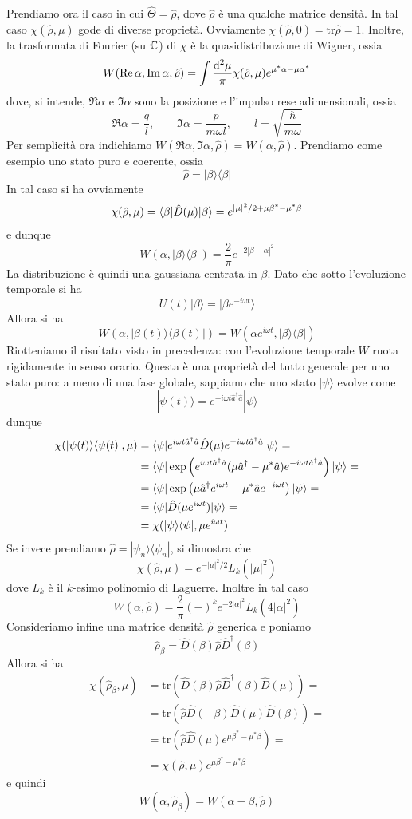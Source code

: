 \documentclass[a4paper, 11pt]{article}
\newcommand{\tr}{\mathrm{tr}}
\renewcommand{\ket}[1]{| #1\rangle}
\renewcommand{\bra}[1]{\langle #1|}
\begin{document}
Prendiamo ora il caso in cui $\hat{\Theta}=\hat{\rho}$, dove $\hat{\rho}$ è una qualche matrice densità. In tal caso $\chi(\hat{\rho},\mu)$ gode di diverse proprietà. Ovviamente $\chi(\hat{\rho},0)=\tr\hat{\rho}=1$. Inoltre, la trasformata di Fourier (su $\mathbb{C}$) di $\chi$ è la quasidistribuzione di Wigner, ossia
\[W(\mathrm{Re}\,\alpha,\mathrm{Im}\,\alpha,\hat{\rho})=\int\frac{\mathrm{d} ^2\mu}{\pi}\chi(\hat{\rho},\mu)e^{\mu^*\alpha-\mu\alpha^*}\]
dove, si intende, $\Re\alpha$ e $\Im\alpha$ sono la posizione e l'impulso rese adimensionali, ossia
\[\Re\alpha=\frac{q}{l},\qquad\Im\alpha=\frac{p}{m\omega l},\qquad l=\sqrt{\frac{\hbar}{m\omega}}\]
Per semplicità ora indichiamo $W(\Re\alpha,\Im\alpha,\hat{\rho})=W(\alpha,\hat{\rho})$. Prendiamo come esempio uno stato puro e coerente, ossia
\[\hat{\rho}=\ket\beta\bra \beta\]
In tal caso si ha ovviamente
\[\chi(\hat{\rho},\mu)=\langle\beta|\hat{D}(\mu)|\beta\rangle=e^{|\mu|^2/2+\mu\beta^*-\mu^*\beta}\]
e dunque
\[W(\alpha,\ket\beta\bra \beta)=\frac{2}{\pi}e^{-2|\beta-\alpha|^2}\]
La distribuzione è quindi una gaussiana centrata in $\beta$. Dato che sotto l'evoluzione temporale si ha
\[U(t)\ket\beta=\ket{\beta e^{-i\omega t}}\]
Allora si ha
\[W(\alpha,\ket {\beta(t)}\bra{\beta(t)})=W(\alpha e^{i\omega t},\ket\beta\bra \beta)\]
Riotteniamo il risultato visto in precedenza: con l'evoluzione temporale $W$ ruota rigidamente in senso orario. Questa è una proprietà del tutto generale per uno stato puro: a meno di una fase globale, sappiamo che uno stato $\ket\psi$ evolve come
\[\ket{\psi(t)}=e^{-i\omega t\hat a^\dagger \hat a}\ket\psi\]
dunque
\begin{align*}
	\chi(\ket{\psi(t)}\bra {\psi(t)},\mu)&=\braketop{\psi}{e^{i\omega t\hat a^\dagger \hat a}\hat{D}(\mu)e^{-i\omega t\hat a^\dagger \hat a}}{\psi}=\\&=\braketop{\psi}{\exp\left(e^{i\omega t\hat a^\dagger \hat a}(\mu\hat{a}^\dagger-\mu^*\hat a)e^{-i\omega t\hat a^\dagger \hat a}\right)}{\psi}=\\&=\braketop{\psi}{\exp\left(\mu\hat{a}^\dagger e^{i\omega t}-\mu^*\hat{a}e^{-i\omega t}\right)}{\psi}=\\&=\braketop{\psi}{\hat{D}(\mu e^{i\omega t})}{\psi}=\\&=\chi(\ket\psi\bra \psi,\mu e^{i\omega t})
\end{align*}
Se invece prendiamo $\hat{\rho}=\ket{\psi_n}\bra {\psi_n}$, si dimostra che
\[\chi(\hat{\rho},\mu)=e^{-|\mu|^2/2}L_k(|\mu|^2)\]
dove $L_k$ è il $k$-esimo polinomio di Laguerre. Inoltre in tal caso
\[W(\alpha,\hat{\rho})=\frac{2}{\pi}(-)^ke^{-2|\alpha|^2}L_k(4|\alpha|^2)\]
Consideriamo infine una matrice densità $\hat{\rho}$ generica e poniamo
\[\hat{\rho}_{\beta}=\hat{D}(\beta)\hat{\rho}\hat{D}^\dagger(\beta)\]
Allora si ha
\begin{align*}
	\chi(\hat{\rho}_\beta,\mu)&=\tr\left(\hat{D}(\beta)\hat{\rho}\hat{D}^\dagger(\beta)\hat{D}(\mu)\right)=\\&=\tr\left(\hat{\rho}\hat{D}(-\beta)\hat{D}(\mu)\hat{D}(\beta)\right)=\\&=\tr\left(\hat{\rho}\hat{D}(\mu)e^{\mu\beta^*-\mu^*\beta}\right)=\\&=\chi(\hat{\rho},\mu)e^{\mu\beta^*-\mu^*\beta}
\end{align*}
e quindi
\[W(\alpha,\hat{\rho}_\beta)=W(\alpha-\beta,\hat{\rho})\]
\end{document}
